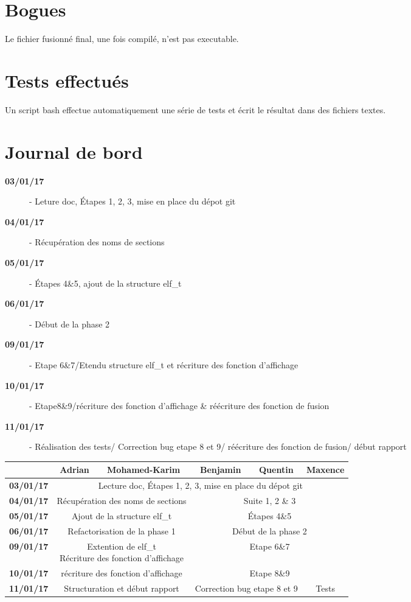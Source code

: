 \documentclass[10pt,twoside]{article}   %
\begin{document}
\section{Bogues}
	Le fichier fusionné final, une fois compilé, n'est pas executable.


\section{Tests effectués}
	Un script bash effectue automatiquement une série de tests et écrit le résultat dans des fichiers textes.

\section{Journal de bord}
	\begin{description}
		\item [\bf{03/01/17}] - Leture doc, Étapes 1, 2, 3, mise en place du dépot git
		\item [\bf{04/01/17}] - Récupération des noms de sections	
		\item [\bf{05/01/17}] - Étapes 4\&5, ajout de la structure elf\_t
		\item [\bf{06/01/17}] - Début de la phase 2 
		\item [\bf{09/01/17}] - Etape 6\&7/Etendu structure elf\_t et récriture des fonction d'affichage
		\item [\bf{10/01/17}] - Etape8\&9/récriture des fonction d'affichage \& réécriture des fonction de fusion
		\item [\bf{11/01/17}] - Réalisation des tests/ Correction bug etape 8 et 9/ réécriture des fonction de fusion/ début rapport
	\end{description}
	\tabcolsep=0.11cm
	\begin{tabular}{| c || *{4}{c|} c |}
		\hline
		& Adrian & Mohamed-Karim & Benjamin & Quentin & Maxence \\
		\hline
		\bf{03/01/17} & \multicolumn{5}{c|}{Lecture doc, Étapes 1, 2, 3, mise en place du dépot git}\\
		\hline
		\bf{04/01/17} & \multicolumn{2}{c|}{Récupération des noms de sections} & \multicolumn{3}{c|}{Suite 1, 2 \& 3} \\
		\hline
		\bf{05/01/17} & \multicolumn{2}{c|}{Ajout de la structure elf\_t} & \multicolumn{3}{c|}{Étapes 4\&5} \\
		\hline
		\bf{06/01/17} & \multicolumn{2}{c|}{Refactorisation de la phase 1} & \multicolumn{3}{c|}{Début de la phase 2} \\
		\hline
		\bf{09/01/17} & \multicolumn{2}{c|}{\parbox[t]{5cm}{Extention de elf\_t\\Récriture des fonction d'affichage}} & \multicolumn{3}{c|}{Etape 6\&7} \\
		\hline
		\bf{10/01/17} & \multicolumn{2}{c|}{récriture des fonction d'affichage} & \multicolumn{3}{c|}{Etape 8\&9} \\
		\hline
		\bf{11/01/17} & \multicolumn{2}{c|}{Structuration et début rapport} & \multicolumn{2}{c|}{Correction bug etape 8 et 9} & Tests\\
		\hline
	\end{tabular}
\end{document}
